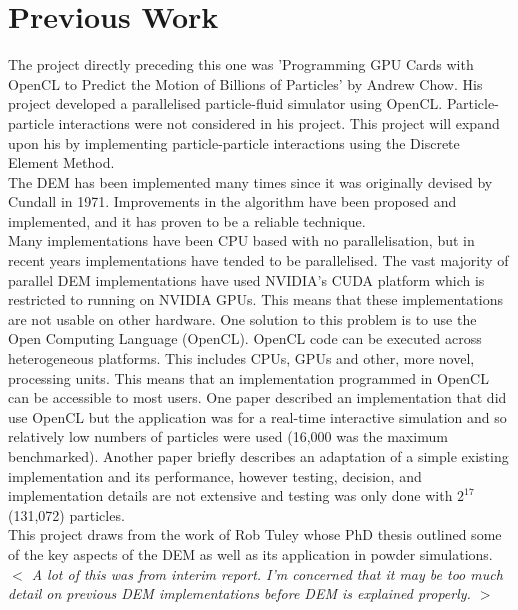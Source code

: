 \documentclass[10pt,a4paper,titlepage]{report}
\begin{document}
\section{Previous Work}
The project directly preceding this one was 'Programming GPU Cards with OpenCL to Predict the Motion of Billions of Particles'\cite{achow} by Andrew Chow. His project developed a parallelised particle-fluid simulator using OpenCL. Particle-particle interactions were not considered in his project. This project will expand upon his by implementing particle-particle interactions using the Discrete Element Method.
\\The DEM has been implemented many times since it was originally devised by Cundall in 1971\cite{cundallphd}. Improvements in the algorithm have been proposed and implemented, and it has proven to be a reliable technique.
\\Many implementations have been CPU based with no parallelisation, but in recent years implementations have tended to be parallelised. The vast majority of parallel DEM implementations\cite{blazedem}\cite{GAN20161172}\cite{demcuda1}\cite{demcuda2}\cite{demcuda3} have used NVIDIA's CUDA platform which is restricted to running on NVIDIA GPUs. This means that these implementations are not usable on other hardware. One solution to this problem is to use the Open Computing Language (OpenCL). OpenCL code can be executed across heterogeneous platforms. This includes CPUs, GPUs and other, more novel, processing units. This means that an implementation programmed in OpenCL can be accessible to most users. One paper described an implementation that did use OpenCL but the application was for a real-time interactive simulation and so relatively low numbers of particles were used (16,000 was the maximum benchmarked)\cite{kinect}. Another paper briefly describes an adaptation of a simple existing implementation and its performance, however testing, decision, and implementation details are not extensive and testing was only done with $2^{17}$ (131,072) particles\cite{washizawa}.
\\This project draws from the work of Rob Tuley whose PhD thesis\cite{tuley} outlined some of the key aspects of the DEM as well as its application in powder simulations.
\\\textit{$<$ A lot of this was from interim report. I'm concerned that it may be too much detail on previous DEM implementations before DEM is explained properly. $>$}
\end{document}
